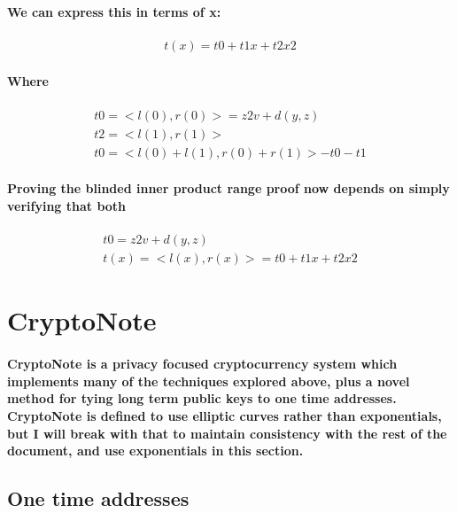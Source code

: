\documentclass{article}
\begin{document}
\paragraph{We can express this in terms of x:}

\begin{eqnarray}
  t(x) = t0 + t1 x + t2 x2
\end{eqnarray}

\paragraph{Where}

\begin{eqnarray}
  t0 = <l(0), r(0)> = z2 v + d(y,z)\\
  t2 = <l(1), r(1)>\\
  t0 = <l(0) + l(1), r(0) + r(1)> - t0 - t1
\end{eqnarray}

\paragraph{Proving the blinded inner product range proof now depends on simply verifying that both }

\begin{eqnarray}
  t0 = z2 v + d(y,z)\\
  t(x) = <l(x), r(x)> = t0 + t1 x + t2 x2
\end{eqnarray}



\section{CryptoNote}

\paragraph{CryptoNote is a privacy focused cryptocurrency system which implements many of the techniques explored above, plus a novel method for tying long term public keys to one time addresses.  CryptoNote is defined to use elliptic curves rather than exponentials, but I will break with that to maintain consistency with the rest of the document, and use exponentials in this section.}


\subsection{One time addresses}
\end{document}
